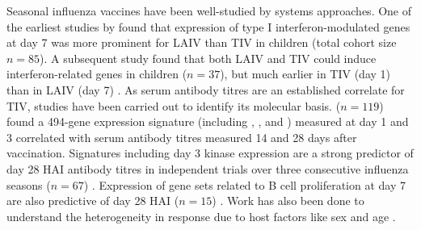 Seasonal influenza vaccines have been well-studied by systems approaches.
One of the earliest studies by \textcite{zhu2010WholeGenomeTranscriptional} found that expression of type I interferon-modulated genes at day 7 was more prominent for \gls{LAIV} than \gls{TIV} in children (total cohort size $n=85$).
A subsequent study found that both \gls{LAIV} and \gls{TIV} could induce interferon-related genes in children ($n=37$), but much earlier in \gls{TIV} (day 1) than in \gls{LAIV} (day 7) \autocite{cao2014DifferencesAntibodyResponses}.
As serum antibody titres are an established correlate for \gls{TIV}, studies have been carried out to identify its molecular basis.
\textcite{bucasas2011EarlyPatternsGene} ($n=119$) found a 494-gene expression signature (including , , and ) measured at day 1 and 3 correlated with serum antibody titres measured 14 and 28 days after vaccination.
Signatures including day 3 kinase  expression are a strong predictor of day 28 \gls{HAI} antibody titres in independent trials over three consecutive influenza seasons ($n=67$) \autocite{nakaya2011SystemsBiologyVaccination}.
Expression of gene sets related to B cell proliferation at day 7 are also predictive of day 28 \gls{HAI} ($n=15$) \autocite{tan2014GeneSignaturesRelated}.
Work has also been done to understand the heterogeneity in response due to host factors like 
sex \autocite{furman2014SystemsAnalysisSex}
and age \autocite{frasca2010IntrinsicDefectsCell,nakaya2015SystemsAnalysisImmunity,nakaya2016SystemsBiologyImmunity,hipc-chisignaturesprojectteam2017MulticohortAnalysisReveals}.
%

